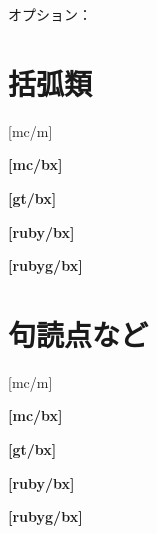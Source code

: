 \documentclass[twocolumn]{ujarticle}
\begin{document}
\parindent0pt

オプション：\texttt{\option}

\section{括弧類}
{
[mc/m]



{\bfseries%
[mc/bx]


}}

{\gtfamily
[gt/m]



{\bfseries%
[gt/bx]


}}

{\mgfamily
[mg/m]


}

{\rubyfamily%
[ruby/m]



{\bfseries%
[ruby/bx]


}}

{\gtfamily\rubyfamily%
[rubyg/m]



{\gtfamily\rubyfamily\bfseries%
[rubyg/bx]


}}

{\mgfamily\rubyfamily%
[rubymg/m]


}


\section{句読点など}
{
[mc/m]



{\bfseries%
[mc/bx]


}}

{\gtfamily
[gt/m]



{\bfseries%
[gt/bx]


}}

{\mgfamily
[mg/m]


}

{\rubyfamily%
[ruby/m]



{\bfseries%
[ruby/bx]


}}

{\gtfamily\rubyfamily%
[rubyg/m]



{\gtfamily\rubyfamily\bfseries%
[rubyg/bx]


}}

{\mgfamily\rubyfamily%
[rubymg/m]


}
\end{document}
